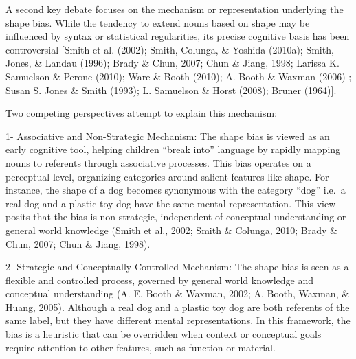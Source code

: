 \documentclass[10pt, letterpaper]{article}
\begin{document}
A second key debate focuses on the mechanism or representation
underlying the shape bias. While the tendency to extend nouns based on
shape may be influenced by syntax or statistical regularities, its
precise cognitive basis has been controversial {[}Smith et al. (2002);
Smith, Colunga, \& Yoshida (2010a); Smith, Jones, \& Landau (1996);
Brady \& Chun, 2007; Chun \& Jiang, 1998; Larissa K. Samuelson \& Perone
(2010); Ware \& Booth (2010); A. Booth \& Waxman (2006) ; Susan S. Jones
\& Smith (1993); L. Samuelson \& Horst (2008); Bruner (1964){]}.

Two competing perspectives attempt to explain this mechanism:

1- Associative and Non-Strategic Mechanism: The shape bias is viewed as
an early cognitive tool, helping children ``break into'' language by
rapidly mapping nouns to referents through associative processes. This
bias operates on a perceptual level, organizing categories around
salient features like shape. For instance, the shape of a dog becomes
synonymous with the category ``dog'' i.e.~a real dog and a plastic toy
dog have the same mental representation. This view posits that the bias
is non-strategic, independent of conceptual understanding or general
world knowledge (Smith et al., 2002; Smith \& Colunga, 2010; Brady \&
Chun, 2007; Chun \& Jiang, 1998).

2- Strategic and Conceptually Controlled Mechanism: The shape bias is
seen as a flexible and controlled process, governed by general world
knowledge and conceptual understanding (A. E. Booth \& Waxman, 2002; A.
Booth, Waxman, \& Huang, 2005). Although a real dog and a plastic toy
dog are both referents of the same label, but they have different mental
representations. In this framework, the bias is a heuristic that can be
overridden when context or conceptual goals require attention to other
features, such as function or material.
\end{document}
